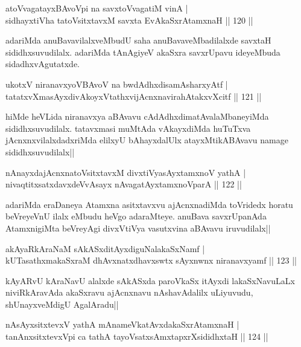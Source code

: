 \begin{shl}
atoV\s vagatayxBAvoV\s pi na savxtoV\s vagatiM vinA |\\
sidhayxtiVha tatoV\s sitxtavxM savxta EvAkaSxrAtamxnaH \hfill || 120 ||
\end{shl}

\begin{artha}
adariMda anuBavavilalxveMbudU saha anuBavaveMbadilalxde savxtaH sididhxsuvudilalx. adariMda tAnAgiyeV akaSxra savxrUpavu ideyeMbuda sidadhxvAgutatxde.
\end{artha}

\begin{shl}
ukotxV niranavxyoV\s BAvoV na bwdAdhxdisamAsharxyAtf |\\
tatatxvXmasAyxdivAkoyxVtathxvijAcnxnavirahAtakxvXcitf \hfill || 121 ||
\end{shl}

\begin{artha}%
hiMde heVLida niranavxya aBAvavu cAdAdhxdimatAvalaMbaneyiMda sididhxsuvudilalx. tatavxmasi muMtAda vAkayxdiMda huTuTxva jAcnxnxvilalxdadxriMda elilxyU bAhayxdalUlx atayxMtikABAvavu namage sididhxsuvudilalx||
\end{artha}

\begin{shl}
nAnayxdajAcnxnatoV\s sitxtavxM divxtiVyasAyx\s \s tamxnoV yathA  |\\
nivaqtitxsatxdavxdeVvAsayx nAvagatAyxtamxnoV\s parA \hfill || 122 ||
\end{shl}

\begin{artha}
adariMda eraDaneya Atamxna asitxtavxvu ajAcnxnadiMda toVridedx horatu beVreyeVnU ilalx eMbudu heVgo adaraMteye. anuBava savxrUpanAda AtamxnigiMta beVreyAgi divxVtiVya vasutxvina aBAvavu iruvudilalx||
\end{artha}

\begin{shl}
akAyaRkAraNaM sAkASxditAyxdiguNalakaSxNamf |\\
kUTasathxmakaSxraM dhAvxnatxdhavxswtx sAyxnwnx niranavxyamf \hfill || 123 ||
\end{shl}

\begin{artha}
kAyARvU kAraNavU alalxde sAkASxda paroVkaSx itAyxdi lakaSxNavuLaLx niviRkAravAda akaSxravu ajAcnxnavu nAshavAdalilx uLiyuvudu, shUnayxveMdigU AgalAradu||
\end{artha}

\begin{shl}
nAsAyxsitxtevxV yathA mAnameVkatAvxdakaSxrAtamxnaH |\\
tanAnxsitxtevxV\s pi ca tathA tayoVsatxsAmxtapxrXsididhxtaH \hfill || 124 ||
\end{shl}

